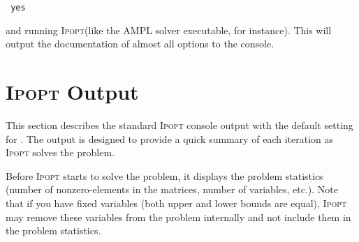 \documentclass[10pt]{article}
\newcommand{\Ipopt}{\textsc{Ipopt}\xspace}
\begin{document}
 {\tt~yes}
\medskip

and running \Ipopt (like the AMPL solver executable, for
instance). This will output the documentation of almost all options to the
console.

\section{\Ipopt Output}\label{sec:output}
This section describes the standard \Ipopt console output with the
default setting for . The output is designed to
provide a quick summary of each iteration as \Ipopt solves the problem.

Before \Ipopt starts to solve the problem, it displays the problem
statistics (number of nonzero-elements in the matrices, number of
variables, etc.). Note that if you have fixed variables (both upper
and lower bounds are equal), \Ipopt may remove these variables from
the problem internally and not include them in the problem statistics.
\end{document}
